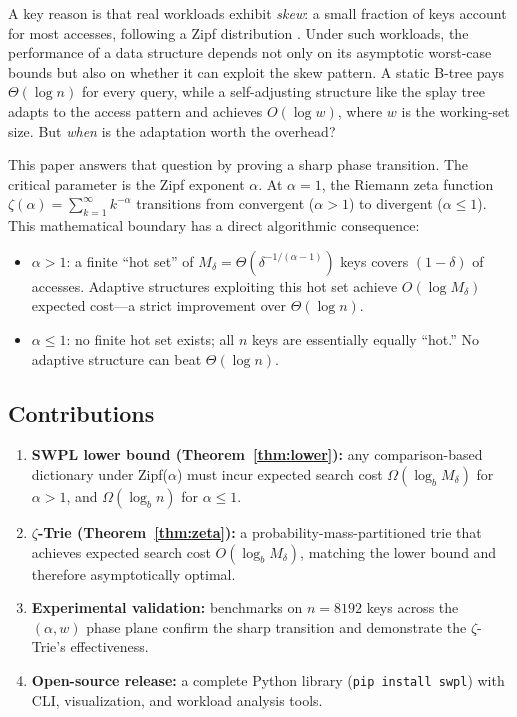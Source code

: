 \documentclass[preprint,12pt,authoryear]{elsarticle}
\newcommand{\Zeta}{\zeta}
\begin{document}
A key reason is that real workloads exhibit \emph{skew}: a small fraction
of keys account for most accesses, following a Zipf distribution
\cite{zipf49}.  Under such workloads, the performance of a data structure
depends not only on its asymptotic worst-case bounds but also on whether
it can exploit the skew pattern.  A static B-tree pays $\Theta(\log n)$
for every query, while a self-adjusting structure like the splay tree
\cite{sleator85} adapts to the access pattern and achieves $O(\log w)$,
where $w$ is the working-set size.  But \emph{when} is the adaptation
worth the overhead?

This paper answers that question by proving a sharp phase transition.
The critical parameter is the Zipf exponent $\alpha$.  At $\alpha = 1$,
the Riemann zeta function $\Zeta(\alpha) = \sum_{k=1}^\infty k^{-\alpha}$
transitions from convergent ($\alpha > 1$) to divergent ($\alpha \leq 1$).
This mathematical boundary has a direct algorithmic consequence:

\begin{itemize}
  \item $\alpha > 1$: a finite ``hot set'' of $M_\delta =
        \Theta(\delta^{-1/(\alpha-1)})$ keys covers $(1-\delta)$ of
        accesses.  Adaptive structures exploiting this hot set achieve
        $O(\log M_\delta)$ expected cost---a strict improvement over
        $\Theta(\log n)$.
  \item $\alpha \leq 1$: no finite hot set exists; all $n$ keys are
        essentially equally ``hot.''  No adaptive structure can beat
        $\Theta(\log n)$.
\end{itemize}

\subsection{Contributions}

\begin{enumerate}
  \item \textbf{SWPL lower bound (Theorem~\ref{thm:lower}):} any
        comparison-based dictionary under Zipf($\alpha$) must incur
        expected search cost $\Omega(\log_b M_\delta)$ for $\alpha > 1$,
        and $\Omega(\log_b n)$ for $\alpha \leq 1$.
  \item \textbf{$\zeta$-Trie (Theorem~\ref{thm:zeta}):} a
        probability-mass-partitioned trie that achieves expected search
        cost $O(\log_b M_\delta)$, matching the lower bound and therefore
        asymptotically optimal.
  \item \textbf{Experimental validation:} benchmarks on $n=8192$ keys
        across the $(\alpha, w)$ phase plane confirm the sharp transition
        and demonstrate the $\zeta$-Trie's effectiveness.
  \item \textbf{Open-source release:} a complete Python library
        (\verb|pip install swpl|) with CLI, visualization, and
        workload analysis tools.
\end{enumerate}
\end{document}
